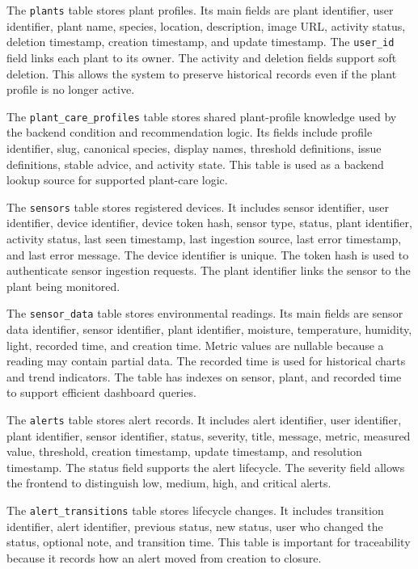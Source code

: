 The \texttt{plants} table stores plant profiles. Its main fields are plant identifier, user identifier, plant name, species, location, description, image URL, activity status, deletion timestamp, creation timestamp, and update timestamp. The \texttt{user\_id} field links each plant to its owner. The activity and deletion fields support soft deletion. This allows the system to preserve historical records even if the plant profile is no longer active.

The \texttt{plant\_care\_profiles} table stores shared plant-profile knowledge used by the backend condition and recommendation logic. Its fields include profile identifier, slug, canonical species, display names, threshold definitions, issue definitions, stable advice, and activity state. This table is used as a backend lookup source for supported plant-care logic.

The \texttt{sensors} table stores registered devices. It includes sensor identifier, user identifier, device identifier, device token hash, sensor type, status, plant identifier, activity status, last seen timestamp, last ingestion source, last error timestamp, and last error message. The device identifier is unique. The token hash is used to authenticate sensor ingestion requests. The plant identifier links the sensor to the plant being monitored.

The \texttt{sensor\_data} table stores environmental readings. Its main fields are sensor data identifier, sensor identifier, plant identifier, moisture, temperature, humidity, light, recorded time, and creation time. Metric values are nullable because a reading may contain partial data. The recorded time is used for historical charts and trend indicators. The table has indexes on sensor, plant, and recorded time to support efficient dashboard queries.

The \texttt{alerts} table stores alert records. It includes alert identifier, user identifier, plant identifier, sensor identifier, status, severity, title, message, metric, measured value, threshold, creation timestamp, update timestamp, and resolution timestamp. The status field supports the alert lifecycle. The severity field allows the frontend to distinguish low, medium, high, and critical alerts.

The \texttt{alert\_transitions} table stores lifecycle changes. It includes transition identifier, alert identifier, previous status, new status, user who changed the status, optional note, and transition time. This table is important for traceability because it records how an alert moved from creation to closure.

